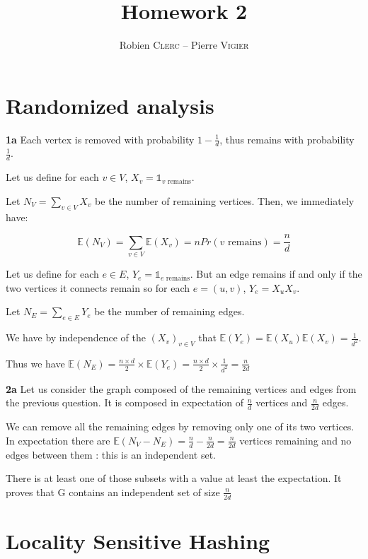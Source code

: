 \documentclass[10pt,a4paper]{article}
\title{Homework 2}
\author{Robien \textsc{Clerc} -- Pierre \textsc{Vigier}}
\theoremstyle{plain}
\begin{document}
\maketitle

\section{Randomized analysis}

\textbf{1a} Each vertex is removed with probability $1 - \frac{1}{d}$, thus remains with probability $\frac{1}{d}$.

Let us define for each $v \in V$, $X_v = \mathds{1}_{v\text{ remains}}$.

Let $N_V = \sum_{v \in V}{X_v}$ be the number of remaining vertices. Then, we immediately have:

$$
\mathbb{E}(N_V) = \sum_{v \in V}{\mathbb{E}(X_v)} = n Pr(v \text{ remains}) = \frac{n}{d}
$$

Let us define for each $e \in E$, $Y_e = \mathds{1}_{e\text{ remains}}$. But an edge remains if and only if the two vertices it connects remain so for each $e = (u, v)$, $Y_e = X_uX_v$.

Let $N_E = \sum_{e \in E}{Y_e}$ be the number of remaining edges. 

We have by independence of the $(X_v)_{v \in V}$ that $\mathbb{E}(Y_e) = \mathbb{E}(X_u) \mathbb{E}(X_v) = \frac{1}{d^2}$.

Thus we have $\mathbb{E}(N_E) = \frac{n \times d}{2} \times \mathbb{E}(Y_e) =\frac{n \times d}{2} \times \frac{1}{d^2} = \frac{n}{2d}$

\textbf{2a} Let us consider the graph composed of the remaining vertices and edges from the previous question. It is composed in expectation of $\frac{n}{d}$ vertices and $\frac{n}{2d}$ edges.

We can remove all the remaining edges by removing only one of its two vertices. In expectation there are $\mathbb{E}(N_V - N_E) = \frac{n}{d} - \frac{n}{2d} = \frac{n}{2d}$ vertices remaining and no edges between them : this is an independent set.

There is at least one of those subsets with a value at least the expectation. It proves that G contains an independent set of size $\frac{n}{2d}$

\section{Locality Sensitive Hashing}
\end{document}
